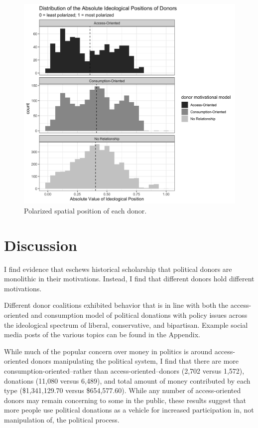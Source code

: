 \documentclass[12pt,]{article}
\begin{document}
\begin{figure}
\centering
\includegraphics{../tables_and_figures/fig_node_position_absolute.jpg}
\caption{Polarized spatial position of each donor.}
\end{figure}

\hypertarget{discussion}{%
\section{Discussion}\label{discussion}}

I find evidence that eschews historical scholarship that political
donors are monolithic in their motivations. Instead, I find that
different donors hold different motivations.

Different donor coalitions exhibited behavior that is in line with both
the access-oriented and consumption model of political donations with
policy issues across the ideological spectrum of liberal, conservative,
and bipartisan. Example social media posts of the various topics can be
found in the Appendix.

While much of the popular concern over money in politics is around
access-oriented donors manipulating the political system, I find that
there are more consumption-oriented--rather than access-oriented--donors
(2,702 versus 1,572), donations (11,080 versus 6,489), and total amount
of money contributed by each type (\$1,341,129.70 versus \$654,577.60).
While any number of access-oriented donors may remain concerning to some
in the public, these results suggest that more people use political
donations as a vehicle for increased participation in, not manipulation
of, the political process.
\end{document}
